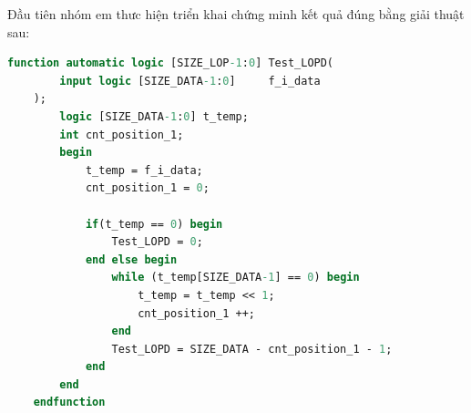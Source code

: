 
Đầu tiên nhóm em thưc hiện triển khai chứng minh kết quả đúng bằng giải thuật sau:

\begin{lstlisting}[style=StyleCode, language=SystemVerilog, caption={Giải thuật chứng minh kết quả của bộ LOPD 24-bit.}]
	function automatic logic [SIZE_LOP-1:0] Test_LOPD(
		input logic [SIZE_DATA-1:0]     f_i_data
	);
		logic [SIZE_DATA-1:0] t_temp;
		int cnt_position_1;
		begin
			t_temp = f_i_data;
			cnt_position_1 = 0;
			
			if(t_temp == 0) begin
				Test_LOPD = 0;
			end else begin
				while (t_temp[SIZE_DATA-1] == 0) begin
					t_temp = t_temp << 1;
					cnt_position_1 ++;
				end
				Test_LOPD = SIZE_DATA - cnt_position_1 - 1;
			end
		end
	endfunction
\end{lstlisting}

